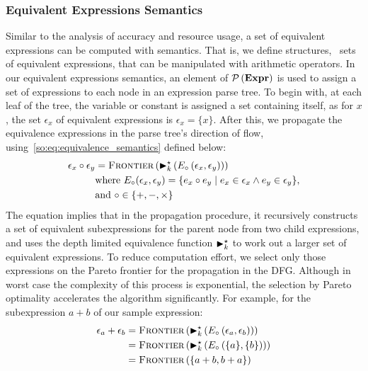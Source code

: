 \subsubsection{Equivalent Expressions Semantics}

Similar to the analysis of accuracy and resource usage, a set of equivalent
expressions can be computed with semantics. That is, we define structures,
\ie~sets of equivalent expressions, that can be manipulated with arithmetic
operators. In our equivalent expressions semantics, an element of
$\mathcal{P}\left({\mathbf{Expr}}\right)$ is used to assign a set of expressions to each node
in an expression parse tree. To begin with, at each leaf of the tree, the
variable or constant is assigned a set containing itself, as for $x$, the set
$\epsilon_x$ of equivalent expressions is $\epsilon_x = \{x\}$. After this, we
propagate the equivalence expressions in the parse tree's direction of flow,
using~\eqref{so:eq:equivalence_semantics} defined below:
\begin{equation}
    \begin{aligned}
        \epsilon_x \circ \epsilon_y &= \operatorname{\textsc{Frontier}}\left(
            \operatorname{\blacktriangleright}^\star_k \left(
                E_\circ \left( \epsilon_x, \epsilon_y \right)
            \right) \right) \\
        & \text{where~}
        E_\circ(\epsilon_x, \epsilon_y) = \{
            e_x \circ e_y \mid e_x \in \epsilon_x \wedge e_y \in \epsilon_y
        \}, \\
        & \text{and~} \circ\in\{+, -, \times\}
    \end{aligned}
    \label{so:eq:equivalence_semantics}
\end{equation}
The equation implies that in the propagation procedure, it recursively
constructs a set of equivalent subexpressions for the parent node from
two child expressions, and uses the depth limited equivalence function
$\operatorname{\blacktriangleright}^\star_k$ to work out a larger set of equivalent expressions. To reduce
computation effort, we select only those expressions on the Pareto frontier
for the propagation in the DFG\@. Although in worst case the complexity of
this process is exponential, the selection by Pareto optimality accelerates
the algorithm significantly. For example, for the subexpression $a + b$ of our
sample expression:
\begin{equation}
    \begin{aligned}
        \epsilon_a + \epsilon_b
            &= \operatorname{\textsc{Frontier}}\left(
                    \operatorname{\blacktriangleright}^\star_k \left(
                        E_\circ \left( \epsilon_a, \epsilon_b \right)
                    \right)
                \right) \\
            &= \operatorname{\textsc{Frontier}}\left(
                    \operatorname{\blacktriangleright}^\star_k \left(
                        E_\circ \left( \{a\}, \{b\} \right)
                    \right)
                \right) \\
            &= \operatorname{\textsc{Frontier}}\left(
                    \{ a + b, b + a \}
                \right)
    \end{aligned}
\end{equation}
